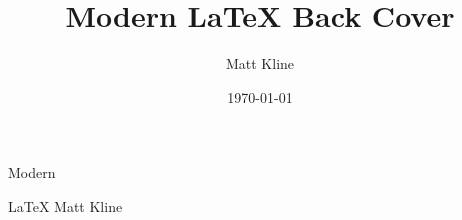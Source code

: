 \documentclass[fontsize=11bp]{scrartcl}
\title{Modern LaTeX Back Cover}
\author{Matt Kline}
\date{\today}
\begin{document}
\fontsize{11bp}{14bp}\selectfont
\pagestyle{empty}
\vspace*{1in}
\begin{center}
\fontsize{0.6in}{0.6in}\selectfont
Modern

\fontsize{1.2in}{1.2in}\selectfont
\LaTeX
\vfill
\LARGE
Matt Kline
\end{center}
\end{document}
